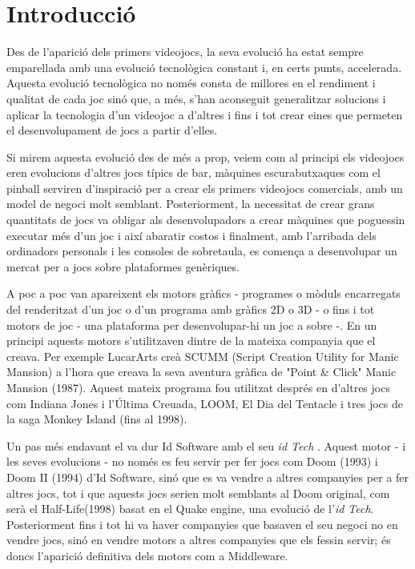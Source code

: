 \chapter{Introducció}

Des de l'aparició dels primers videojocs, la seva evolució ha estat sempre emparellada amb una evolució tecnològica constant i, en certs punts, accelerada. Aquesta evolució tecnològica no només consta de millores en el rendiment i qualitat de cada joc sinó que, a més, s’han aconseguit generalitzar solucions i aplicar la tecnologia d’un videojoc a d'altres i fins i tot crear eines que permeten el desenvolupament de jocs a partir d'elles.

Si mirem aquesta evolució des de més a prop, veiem com al principi els videojocs eren evolucions d'altres jocs típics de bar, màquines escurabutxaques com el pinball serviren d'inspiració per a crear els primers videojocs comercials, amb un model de negoci molt semblant. Posteriorment, la necessitat de crear grans quantitats de jocs va obligar als desenvolupadors a crear màquines que poguessin executar més d'un joc i així abaratir costos i finalment, amb l'arribada dels ordinadors personals i les consoles de sobretaula, es comença a desenvolupar un mercat per a jocs sobre plataformes genèriques.

A poc a poc van apareixent els motors gràfics - programes o mòduls encarregats del renderitzat d'un joc o d'un programa amb gràfics 2D o 3D - o fins i tot motors de joc - una plataforma per desenvolupar-hi un joc a sobre -. En un principi aquests motors s'utilitzaven dintre de la mateixa companyia que el creava. Per exemple LucarArts creà {SCUMM} ({Script Creation Utility for Manic Mansion}) \citep{WikiScumm} a l'hora que creava la seva aventura gràfica de "Point \& Click" Manic Mansion (1987). Aquest mateix programa fou utilitzat després en d'altres jocs com Indiana Jones i l'Última Creuada, LOOM, El Dia del Tentacle i tres jocs de la saga Monkey Island (fins al 1998).

Un pas més endavant el va dur Id Software amb el seu {\em id Tech}  \citep{WikiScumm}. Aquest motor - i les seves evolucions - no només es feu servir per fer jocs com Doom (1993) i Doom II (1994) d'Id Software, sinó que es va vendre a altres companyies per a fer altres jocs, tot i que aquests jocs serien molt semblants al Doom original, com serà el Half-Life(1998) basat en el Quake engine, una evolució de l'{\em id Tech}. Posteriorment fins i tot hi va haver companyies que basaven el seu negoci no en vendre jocs, sinó en vendre motors a altres companyies que els fessin servir; és doncs l'aparició definitiva dels motors com a Middleware.


